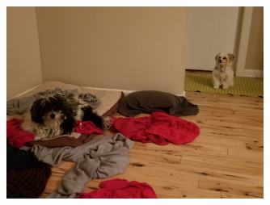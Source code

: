 \documentclass[aspectratio=1610,pdftex,dvipsnames,compress,xcolor={dvipsnames}]{beamer}
\begin{document}


































\begin{frame}[plain]{}
    \begin{figure}
        \centering
        \includegraphics[width=0.75\textwidth]{final.jpg}
    \end{figure}
\end{frame}


%
%
%
\end{document}
